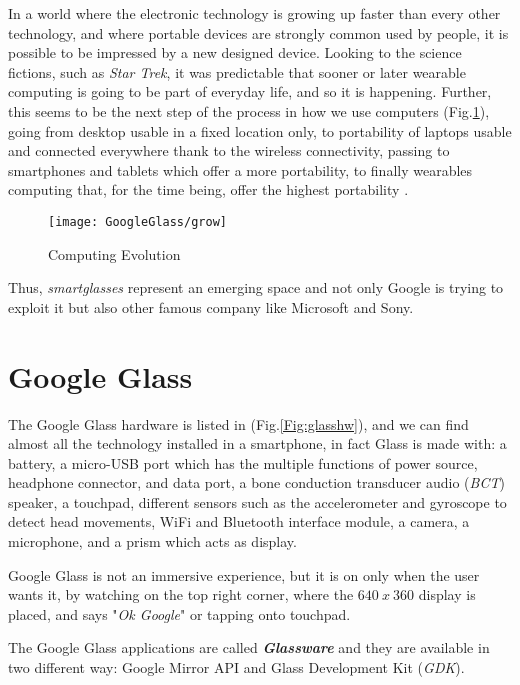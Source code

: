 In a world where the electronic technology is growing up faster than every other technology, and where portable devices are strongly common used by people, it is possible to be impressed by a new designed device. Looking to the science fictions, such as \textit{Star Trek}, it was predictable that sooner or later wearable computing is going to be part of everyday life, and so it is happening. Further, this seems to be the next step of the process in how we use computers (Fig.\ref{Fig:grow}), going from desktop usable in a fixed location only, to portability of laptops usable and connected everywhere thank to the wireless connectivity, passing to smartphones and tablets which offer a more portability, to finally wearables computing that, for the time being, offer the highest portability \cite{DDGG}.


\begin{figure}[h]
	\centering
	\texttt{[image: GoogleGlass/grow]}
	\caption{Computing Evolution}
	\label{Fig:grow}
	
\end{figure}

Thus, \textit{smartglasses} represent an emerging space and not only Google is trying to exploit it but also other famous company like Microsoft and Sony.

\section{Google Glass}

The Google Glass hardware is listed in (Fig.\ref{Fig:glasshw}), and we can find almost all the technology installed in a smartphone, in fact Glass is made with: a battery, a micro-USB port which has the multiple functions of power source, headphone connector, and data port, a bone conduction transducer audio (\textit{BCT}) speaker, a touchpad, different sensors such as the accelerometer and gyroscope to detect head movements, WiFi and Bluetooth interface module, a camera, a microphone, and a prism which acts as display.

Google Glass is not an immersive experience, but it is on only when the user wants it, by watching on the top right corner, where the $640\ x\ 360$ display is placed, and says "\textit{Ok Google}" or tapping onto touchpad.

The Google Glass applications are called \textit{\textbf{Glassware}} and they are available in two different way: Google Mirror API and Glass Development Kit (\textit{GDK}).

